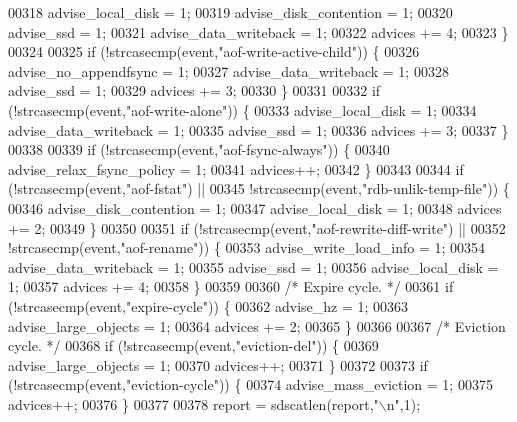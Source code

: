 \begin{DoxyCode}
{{00318             advise\_local\_disk = 1;
00319             advise\_disk\_contention = 1;
00320             advise\_ssd = 1;
00321             advise\_data\_writeback = 1;
00322             advices += 4;
00323         \}
00324 
00325         \textcolor{keywordflow}{if} (!strcasecmp(event,\textcolor{stringliteral}{"aof-write-active-child"})) \{
00326             advise\_no\_appendfsync = 1;
00327             advise\_data\_writeback = 1;
00328             advise\_ssd = 1;
00329             advices += 3;
00330         \}
00331 
00332         \textcolor{keywordflow}{if} (!strcasecmp(event,\textcolor{stringliteral}{"aof-write-alone"})) \{
00333             advise\_local\_disk = 1;
00334             advise\_data\_writeback = 1;
00335             advise\_ssd = 1;
00336             advices += 3;
00337         \}
00338 
00339         \textcolor{keywordflow}{if} (!strcasecmp(event,\textcolor{stringliteral}{"aof-fsync-always"})) \{
00340             advise\_relax\_fsync\_policy = 1;
00341             advices++;
00342         \}
00343 
00344         \textcolor{keywordflow}{if} (!strcasecmp(event,\textcolor{stringliteral}{"aof-fstat"}) ||
00345             !strcasecmp(event,\textcolor{stringliteral}{"rdb-unlik-temp-file"})) \{
00346             advise\_disk\_contention = 1;
00347             advise\_local\_disk = 1;
00348             advices += 2;
00349         \}
00350 
00351         \textcolor{keywordflow}{if} (!strcasecmp(event,\textcolor{stringliteral}{"aof-rewrite-diff-write"}) ||
00352             !strcasecmp(event,\textcolor{stringliteral}{"aof-rename"})) \{
00353             advise\_write\_load\_info = 1;
00354             advise\_data\_writeback = 1;
00355             advise\_ssd = 1;
00356             advise\_local\_disk = 1;
00357             advices += 4;
00358         \}
00359 
00360         \textcolor{comment}{/* Expire cycle. */}
00361         \textcolor{keywordflow}{if} (!strcasecmp(event,\textcolor{stringliteral}{"expire-cycle"})) \{
00362             advise\_hz = 1;
00363             advise\_large\_objects = 1;
00364             advices += 2;
00365         \}
00366 
00367         \textcolor{comment}{/* Eviction cycle. */}
00368         \textcolor{keywordflow}{if} (!strcasecmp(event,\textcolor{stringliteral}{"eviction-del"})) \{
00369             advise\_large\_objects = 1;
00370             advices++;
00371         \}
00372 
00373         \textcolor{keywordflow}{if} (!strcasecmp(event,\textcolor{stringliteral}{"eviction-cycle"})) \{
00374             advise\_mass\_eviction = 1;
00375             advices++;
00376         \}
00377 
00378         report = sdscatlen(report,\textcolor{stringliteral}{"\(\backslash\)n"},1);
}}
\end{DoxyCode}
